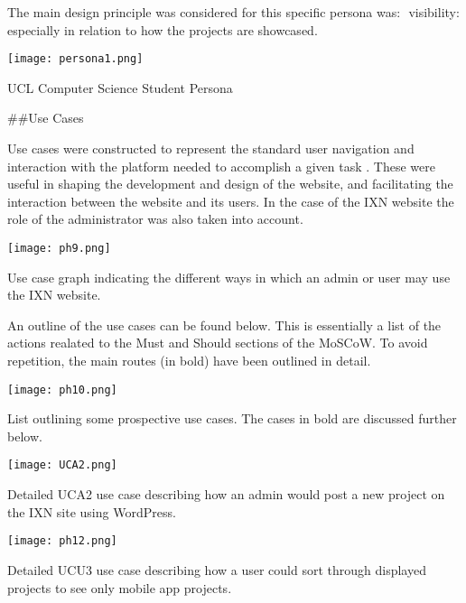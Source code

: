 \documentclass[fontsize=11pt]{extarticle}
\numberwithin{figure}{section} %
\begin{document}
The main design principle was considered for this specific persona was:
​ visibility: especially in relation to how the projects are showcased.
​

\begin{table}[H]
      \centering
      \texttt{[image: persona1.png]}
      \caption{UCL Computer Science Student Persona}
\end{table}

\#\#Use Cases

Use cases were constructed to represent the standard user navigation and
interaction with the platform needed to accomplish a given task
\cite{g3}. These were useful in shaping the development and design of
the website, and facilitating the interaction between the website and
its users. In the case of the IXN website the role of the administrator
was also taken into account.

\begin{table}[H]
      \centering
      \texttt{[image: ph9.png]}
      \caption{Use case graph indicating the different ways in which an admin or user may use the IXN website.}
\end{table}

An outline of the use cases can be found below. This is essentially a
list of the actions realated to the Must and Should sections of the
MoSCoW. To avoid repetition, the main routes (in bold) have been
outlined in detail.

\begin{table}[H]
      \centering
      \texttt{[image: ph10.png]}
      \caption{List outlining some prospective use cases. The cases in bold are discussed further below.}
 \end{table}

\begin{table}[H]
      \centering
      \texttt{[image: UCA2.png]}
      \caption{Detailed UCA2 use case describing how an admin would post a new project on the IXN site using WordPress.}
 \end{table}

\begin{table}[H]
      \centering
      \texttt{[image: ph12.png]}
      \caption{Detailed UCU3 use case describing how a user could sort through displayed projects to see only mobile app projects. }
 \end{table}
\end{document}
